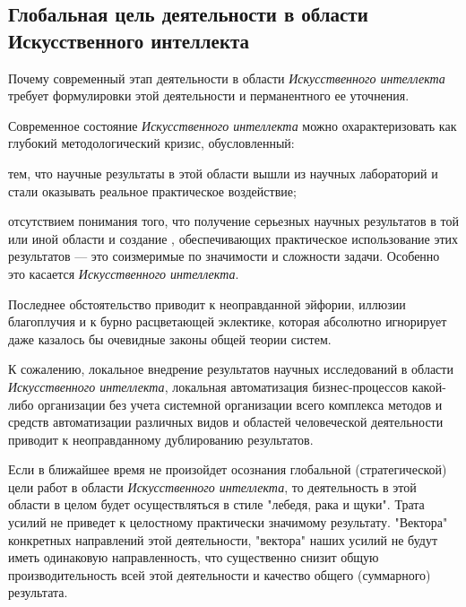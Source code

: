 \subsection*{Глобальная цель деятельности в области Искусственного интеллекта}
Почему современный этап деятельности в области \textit{Искусственного интеллекта} требует формулировки   этой деятельности и перманентного ее уточнения.

Современное состояние \textit{Искусственного интеллекта} можно охарактеризовать как глубокий методологический кризис, обусловленный:
\begin{textitemize}
	\item тем, что научные результаты в этой области вышли из научных лабораторий и стали оказывать реальное практическое воздействие;
	\item отсутствием понимания того, что получение серьезных научных результатов в той или иной области и создание , обеспечивающих  практическое использование этих результатов --- это соизмеримые по значимости и сложности задачи. Особенно это касается \textit{Искусственного интеллекта}.
\end{textitemize}

Последнее обстоятельство приводит к неоправданной эйфории, иллюзии благоплучия и к бурно расцветающей эклектике, которая абсолютно игнорирует даже казалось бы очевидные законы общей теории систем.

К сожалению, локальное внедрение результатов научных исследований в области \textit{Искусственного интеллекта}, локальная автоматизация бизнес-процессов какой-либо организации без учета системной организации всего комплекса методов и средств автоматизации различных видов и областей человеческой деятельности приводит к неоправданному дублированию результатов. 

Если в ближайшее время не произойдет осознания глобальной (стратегической) цели работ в области \textit{Искусственного интеллекта}, то деятельность в этой области в целом будет осуществляться в стиле "лебедя, рака и щуки"{}. Трата усилий не приведет к целостному практически значимому результату. "Вектора"{} конкретных направлений этой деятельности, "вектора"{} наших усилий не будут иметь одинаковую направленность, что существенно снизит общую  производительность всей этой деятельности и качество общего (суммарного) результата.

